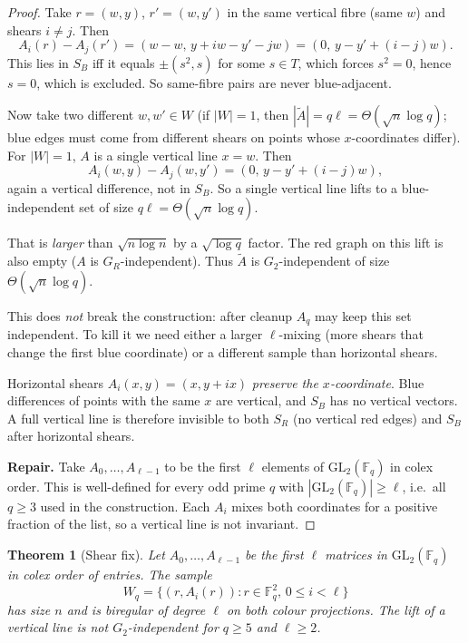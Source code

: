 \documentclass[11pt]{article}
\newtheorem{theorem}{Theorem}
\theoremstyle{definition}
\newcommand{\F}{\mathbb{F}}
\begin{document}
\begin{proof}
Take $r=(w,y)$, $r'=(w,y')$ in the same vertical fibre (same $w$) and shears $i\ne j$.
Then
\[
  A_i(r)-A_j(r')=(w-w,\, y+iw-y'-jw)=(0,\, y-y'+(i-j)w).
\]
This lies in $S_B$ iff it equals $\pm(s^{2},s)$ for some $s\in T$, which forces $s^{2}=0$, hence $s=0$, which is excluded.
So same-fibre pairs are never blue-adjacent.

Now take two different $w,w'\in W$ (if $|W|=1$, then $|\widetilde A|=q\ell=\Theta(\sqrt{n}\log q)$; blue edges must come from different shears on points whose $x$-coordinates differ).
For $|W|=1$, $A$ is a single vertical line $x=w$.
Then
\[
  A_i(w,y)-A_j(w,y')=(0,\, y-y'+(i-j)w),
\]
again a vertical difference, not in $S_B$.
So a single vertical line lifts to a blue-independent set of size $q\ell=\Theta(\sqrt{n}\log q)$.

That is \emph{larger} than $\sqrt{n\log n}$ by a $\sqrt{\log q}$ factor.
The red graph on this lift is also empty ($A$ is $G_R$-independent).
Thus $\widetilde A$ is $G_2$-independent of size $\Theta(\sqrt{n}\log q)$.

This does \emph{not} break the construction: after cleanup $A_q$ may keep this set independent.
To kill it we need either a larger $\ell$-mixing (more shears that change the first blue coordinate) or a different sample than horizontal shears.

Horizontal shears $A_i(x,y)=(x,y+ix)$ \emph{preserve the $x$-coordinate}.
Blue differences of points with the same $x$ are vertical, and $S_B$ has no vertical vectors.
A full vertical line is therefore invisible to both $S_R$ (no vertical red edges) and $S_B$ after horizontal shears.

\textbf{Repair.}
Take $A_0,\dots,A_{\ell-1}$ to be the first $\ell$ elements of $\mathrm{GL}_2(\F_q)$ in colex order.
This is well-defined for every odd prime $q$ with $|\mathrm{GL}_2(\F_q)|\ge\ell$, i.e.\ all $q\ge 3$ used in the construction.
Each $A_i$ mixes both coordinates for a positive fraction of the list, so a vertical line is not invariant.
\end{proof}

\begin{theorem}[Shear fix]\label{thm:fix}
Let $A_0,\dots,A_{\ell-1}$ be the first $\ell$ matrices in $\mathrm{GL}_2(\F_q)$ in colex order of entries.
The sample
\[
  W_q=\bigl\{(r,A_i(r)):r\in\F_q^{2},\,0\le i<\ell\bigr\}
\]
has size $n$ and is biregular of degree $\ell$ on both colour projections.
The lift of a vertical line is not $G_2$-independent for $q\ge 5$ and $\ell\ge 2$.
\end{theorem}
\end{document}
